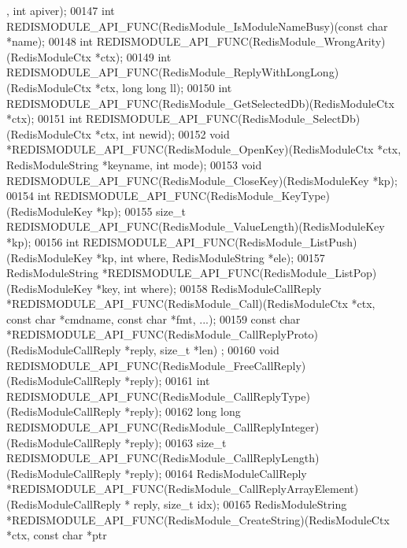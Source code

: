 \begin{DoxyCode}
      , \textcolor{keywordtype}{int} apiver);
00147 \textcolor{keywordtype}{int} REDISMODULE\_API\_FUNC(RedisModule\_IsModuleNameBusy)(\textcolor{keyword}{const} \textcolor{keywordtype}{char} *name);
00148 \textcolor{keywordtype}{int} REDISMODULE\_API\_FUNC(RedisModule\_WrongArity)(RedisModuleCtx *ctx);
00149 \textcolor{keywordtype}{int} REDISMODULE\_API\_FUNC(RedisModule\_ReplyWithLongLong)(RedisModuleCtx *ctx, \textcolor{keywordtype}{long} \textcolor{keywordtype}{long} ll);
00150 \textcolor{keywordtype}{int} REDISMODULE\_API\_FUNC(RedisModule\_GetSelectedDb)(RedisModuleCtx *ctx);
00151 \textcolor{keywordtype}{int} REDISMODULE\_API\_FUNC(RedisModule\_SelectDb)(RedisModuleCtx *ctx, \textcolor{keywordtype}{int} newid);
00152 \textcolor{keywordtype}{void} *REDISMODULE\_API\_FUNC(RedisModule\_OpenKey)(RedisModuleCtx *ctx, RedisModuleString *keyname, \textcolor{keywordtype}{int} 
      mode);
00153 \textcolor{keywordtype}{void} REDISMODULE\_API\_FUNC(RedisModule\_CloseKey)(RedisModuleKey *kp);
00154 \textcolor{keywordtype}{int} REDISMODULE\_API\_FUNC(RedisModule\_KeyType)(RedisModuleKey *kp);
00155 size\_t REDISMODULE\_API\_FUNC(RedisModule\_ValueLength)(RedisModuleKey *kp);
00156 \textcolor{keywordtype}{int} REDISMODULE\_API\_FUNC(RedisModule\_ListPush)(RedisModuleKey *kp, \textcolor{keywordtype}{int} where, RedisModuleString *ele);
00157 RedisModuleString *REDISMODULE\_API\_FUNC(RedisModule\_ListPop)(RedisModuleKey *key, \textcolor{keywordtype}{int} where);
00158 RedisModuleCallReply *REDISMODULE\_API\_FUNC(RedisModule\_Call)(RedisModuleCtx *ctx, \textcolor{keyword}{const} \textcolor{keywordtype}{char} *cmdname,
       \textcolor{keyword}{const} \textcolor{keywordtype}{char} *fmt, ...);
00159 \textcolor{keyword}{const} \textcolor{keywordtype}{char} *REDISMODULE\_API\_FUNC(RedisModule\_CallReplyProto)(RedisModuleCallReply *reply, size\_t *len)
      ;
00160 \textcolor{keywordtype}{void} REDISMODULE\_API\_FUNC(RedisModule\_FreeCallReply)(RedisModuleCallReply *reply);
00161 \textcolor{keywordtype}{int} REDISMODULE\_API\_FUNC(RedisModule\_CallReplyType)(RedisModuleCallReply *reply);
00162 \textcolor{keywordtype}{long} \textcolor{keywordtype}{long} REDISMODULE\_API\_FUNC(RedisModule\_CallReplyInteger)(RedisModuleCallReply *reply);
00163 size\_t REDISMODULE\_API\_FUNC(RedisModule\_CallReplyLength)(RedisModuleCallReply *reply);
00164 RedisModuleCallReply *REDISMODULE\_API\_FUNC(RedisModule\_CallReplyArrayElement)(RedisModuleCallReply *
      reply, size\_t idx);
00165 RedisModuleString *REDISMODULE\_API\_FUNC(RedisModule\_CreateString)(RedisModuleCtx *ctx, \textcolor{keyword}{const} \textcolor{keywordtype}{char} *ptr

\end{DoxyCode}
